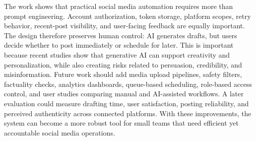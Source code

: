 \documentclass[conference]{IEEEtran}
\begin{document}
The work shows that practical social media automation requires more than prompt engineering. Account authorization, token storage, platform scopes, retry behavior, recent-post visibility, and user-facing feedback are equally important. The design therefore preserves human control: AI generates drafts, but users decide whether to post immediately or schedule for later. This is important because recent studies show that generative AI can support creativity and personalization, while also creating risks related to persuasion, credibility, and misinformation. Future work should add media upload pipelines, safety filters, factuality checks, analytics dashboards, queue-based scheduling, role-based access control, and user studies comparing manual and AI-assisted workflows. A later evaluation could measure drafting time, user satisfaction, posting reliability, and perceived authenticity across connected platforms. With these improvements, the system can become a more robust tool for small teams that need efficient yet accountable social media operations.
\end{document}
